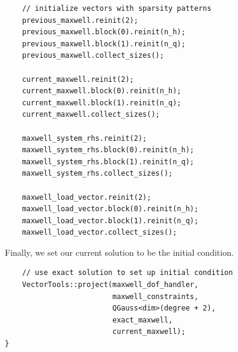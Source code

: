 \documentclass{article}
\begin{document}
\begin{lstlisting}
    // initialize vectors with sparsity patterns
    previous_maxwell.reinit(2);
    previous_maxwell.block(0).reinit(n_h);
    previous_maxwell.block(1).reinit(n_q);
    previous_maxwell.collect_sizes();

    current_maxwell.reinit(2);
    current_maxwell.block(0).reinit(n_h);
    current_maxwell.block(1).reinit(n_q);
    current_maxwell.collect_sizes();

    maxwell_system_rhs.reinit(2);
    maxwell_system_rhs.block(0).reinit(n_h);
    maxwell_system_rhs.block(1).reinit(n_q);
    maxwell_system_rhs.collect_sizes();

    maxwell_load_vector.reinit(2);
    maxwell_load_vector.block(0).reinit(n_h);
    maxwell_load_vector.block(1).reinit(n_q);
    maxwell_load_vector.collect_sizes();
\end{lstlisting}
Finally, we set our current solution to be the initial condition.
\begin{lstlisting}
    // use exact solution to set up initial condition
    VectorTools::project(maxwell_dof_handler,
                         maxwell_constraints,
                         QGauss<dim>(degree + 2),
                         exact_maxwell,
                         current_maxwell);
}
\end{lstlisting}
\end{document}
